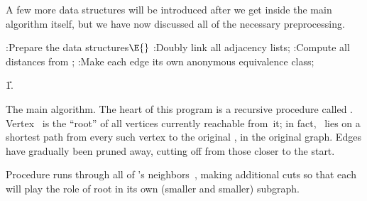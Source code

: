A few more data structures will be introduced after we get
inside the main algorithm itself, but we have now discussed all
of the necessary preprocessing.

\Y\B\4:Prepare the data structures\X${}\E{}$\6
:Doubly link all adjacency lists\X;\6
:Compute all distances from \X;\6
:Make each edge its own anonymous equivalence class\X;\par
\U1.\fi

The main algorithm. The heart of this program is a
recursive procedure
called . Vertex~ is the ``root'' of all
vertices currently reachable from~it; in fact,
~lies on a shortest path from every such vertex
to the original , in the original graph. Edges have
gradually
been pruned away, cutting  off from those closer to the start.

Procedure  runs through all of 's neighbors~,
making additional cuts so that each  will play the role of root
in its own (smaller and smaller) subgraph.

